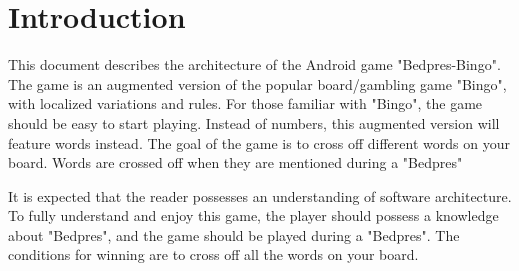 \section{Introduction} 
\label{sec:introduction}


This document describes the architecture of the Android game "Bedpres-Bingo". The game is an augmented version of the popular board/gambling game "Bingo", with localized variations and rules. For those familiar with "Bingo", the game should be easy to start playing. Instead of numbers, this augmented version will feature words instead. The goal of the game is to cross off different words on your board. Words are crossed off when they are mentioned during a "Bedpres"

It is expected that the reader possesses an understanding of software architecture. To fully understand and enjoy this game, the player should possess a knowledge about "Bedpres", and the game should be played during a "Bedpres". The conditions for winning are to cross off all the words on your board.